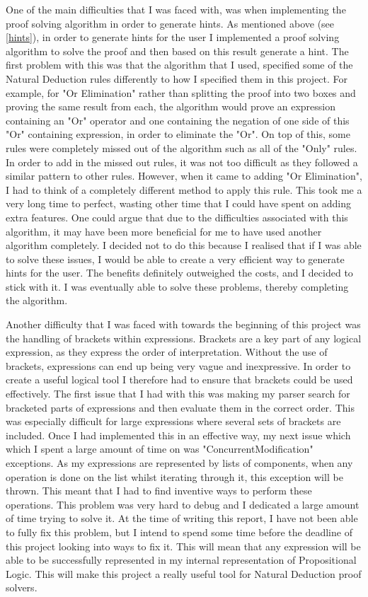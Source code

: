 One of the main difficulties that I was faced with, was when implementing the proof solving algorithm in order to generate hints. As mentioned above (see \ref{hints}), in order to generate hints for the user I implemented a proof solving algorithm to solve the proof and then based on this result generate a hint. The first problem with this was that the algorithm that I used, specified some of the Natural Deduction rules differently to how I specified them in this project. For example, for "Or Elimination" rather than splitting the proof into two boxes and proving the same result from each, the algorithm would prove an expression containing an "Or" operator and one containing the negation of one side of this "Or" containing expression, in order to eliminate the "Or". On top of this, some rules were completely missed out of the algorithm such as all of the "Only" rules. In order to add in the missed out rules, it was not too difficult as they followed a similar pattern to other rules. However, when it came to adding "Or Elimination", I had to think of a completely different method to apply this rule. This took me a very long time to perfect, wasting other time that I could have spent on adding extra features. One could argue that due to the difficulties associated with this algorithm, it may have been more beneficial for me to have used another algorithm completely. I decided not to do this because I realised that if I was able to solve these issues, I would be able to create a very efficient way to generate hints for the user. The benefits definitely outweighed the costs, and I decided to stick with it. I was eventually able to solve these problems, thereby completing the algorithm.  

Another difficulty that I was faced with towards the beginning of this project was the handling of brackets within expressions. Brackets are a key part of any logical expression, as they express the order of interpretation. Without the use of brackets, expressions can end up being very vague and inexpressive. In order to create a useful logical tool I therefore had to ensure that brackets could be used effectively. The first issue that I had with this was making my parser search for bracketed parts of expressions and then evaluate them in the correct order. This was especially difficult for large expressions where several sets of brackets are included. Once I had implemented this in an effective way, my next issue which which I spent a large amount of time on was "ConcurrentModification" exceptions. As my expressions are represented by lists of components, when any operation is done on the list whilst iterating through it, this exception will be thrown. This meant that I had to find inventive ways to perform these operations. This problem was very hard to debug and I dedicated a large amount of time trying to solve it. At the time of writing this report, I have not been able to fully fix this problem, but I intend to spend some time before the deadline of this project looking into ways to fix it. This will mean that any expression will be able to be successfully represented in my internal representation of Propositional Logic. This will make this project a really useful tool for Natural Deduction proof solvers.

